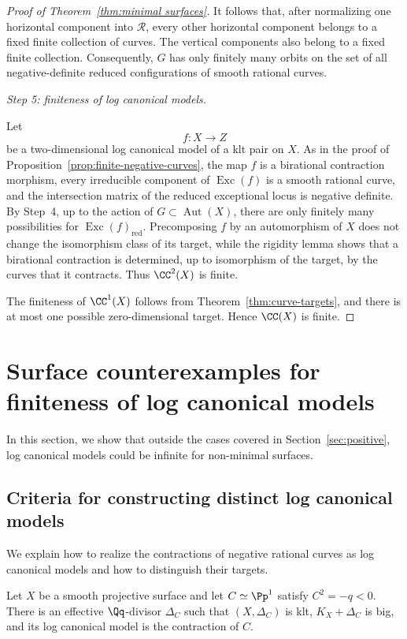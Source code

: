 \documentclass[12pt]{amsart}
\begin{document}
\begin{proof}[Proof of Theorem~\ref{thm:minimal surfaces}]
It follows that, after normalizing one horizontal component into
$\mathcal R$, every other horizontal component belongs to a fixed finite
collection of curves.  The vertical components also belong to a fixed finite
collection.  Consequently, $G$ has only finitely many orbits on the set of all
negative-definite reduced configurations of smooth rational curves.

\medskip
\noindent
\textit{Step 5: finiteness of log canonical models.}

Let
\[
    f:X\longrightarrow Z
\]
be a two-dimensional log canonical model of a klt pair on $X$.  As in the
proof of Proposition~\ref{prop:finite-negative-curves}, the map $f$ is a
birational contraction morphism, every irreducible component of
$\operatorname{Exc}(f)$ is a smooth rational curve, and the intersection
matrix of the reduced exceptional locus is negative definite.  By Step~4,
up to the action of $G\subset\operatorname{Aut}(X)$, there are only finitely
many possibilities for $\operatorname{Exc}(f)_{\mathrm{red}}$.  Precomposing
$f$ by an automorphism of $X$ does not change the isomorphism class of its
target, while the rigidity lemma \cite[Lemma~1.15]{Deb01} shows that a
birational contraction is determined, up to isomorphism of the target, by the
curves that it contracts.  Thus $\CC^2(X)$ is finite.

The finiteness of $\CC^1(X)$ follows from Theorem~\ref{thm:curve-targets}, and
there is at most one possible zero-dimensional target.  Hence $\CC(X)$ is finite.
\end{proof}

\section{Surface counterexamples for finiteness of log canonical models}\label{sec:surface-counterexamples}

In this section, we show that outside the cases covered in Section~\ref{sec:positive}, log canonical models could be infinite for non-minimal surfaces.


\subsection{Criteria for constructing distinct log canonical models}


We explain how to realize the contractions of negative rational
curves as log canonical models and how to distinguish their targets.


\begin{proposition}\label{prop:realize-negative-curve}
Let $X$ be a smooth projective surface and let $C\simeq\Pp^1$ satisfy $C^2=-q<0$. There is an effective $\Qq$-divisor $\Delta_C$ such that $(X,\Delta_C)$ is klt, $K_X+\Delta_C$ is big, and its log canonical model is the contraction of $C$.
\end{proposition}
\end{document}
